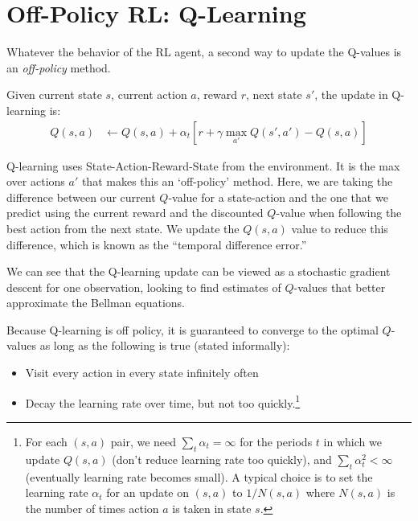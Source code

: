 \documentclass[11pt, letterpaper]{article}
\begin{document}
\section{Off-Policy RL: Q-Learning}

Whatever the behavior of the RL agent, a second way to update the
Q-values is an \emph{off-policy} method. 


Given current state $s$, current action $a$, reward $r$, next state
$s'$, the update in Q-learning is:
%
%
\begin{align}
  Q(s,a) & \leftarrow  Q(s,a)+\alpha_t[r +\gamma
           \max_{a'}Q(s',a')-Q(s,a)]
           \end{align}

           Q-learning uses State-Action-Reward-State from the
           environment.  It is the max over actions $a'$ that makes
          this an `off-policy' method.
          Here, we are taking the difference between our current $Q$-value
          for a state-action and the one that we predict using the
          current reward and the discounted $Q$-value when following
          the best action from the next state. 
          We update the $Q(s,a)$ value to reduce this difference,
          which is known as the ``temporal difference error.''

          We can see that the Q-learning update can be viewed as a
          stochastic gradient descent for one observation, looking to
          find estimates of $Q$-values that better approximate the
          Bellman equations.

           Because Q-learning is off policy, it is guaranteed to
           converge to the optimal $Q$-values as long as the following
           is true (stated informally):
           \begin{itemize}
           \item Visit every action in every state infinitely often
           \item Decay the learning rate over time, but not too
             quickly.\footnote{For each $(s,a)$ pair, we need
             $\sum_t \alpha_t=\infty$ for the periods $t$ in which we
             update $Q(s,a)$ (don't reduce learning rate too quickly),
             and $\sum_t\alpha_t^2<\infty$ (eventually learning rate
             becomes small). A typical choice is to set the  learning rate
    $\alpha_t$ for an update on $(s,a)$  to $1/N(s,a)$ where
    $N(s,a)$ is the number of times action $a$ is taken in state $s$.}
  \end{itemize}
\end{document}
